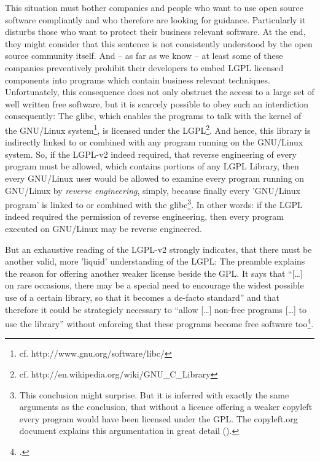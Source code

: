 This situation must bother companies and people who want to use open source
software compliantly and who therefore are looking for guidance. Particularly it
disturbs those who want to protect their business relevant software. At the end,
they might consider that this sentence is not consistently understood by the
open source community itself. And -- as far as we know -- at least some of these
companies preventively prohibit their developers to embed LGPL licensed
components into programs which contain business relevant techniques.
Unfortunately, this consequence does not only obstruct the access to a large set
of well written free software, but it is scarcely possible to obey such an
interdiction consequently: The glibc, which enables the programs to talk with
the kernel of the GNU/Linux system\footnote{cf.
http://www.gnu.org/software/libc/}, is licensed under the LGPL\footnote{cf.
http://en.wikipedia.org/wiki/GNU\_C\_Library}. And hence, this library is
indirectly linked to or combined with any program running on the GNU/Linux
system. So, if the LGPL-v2 indeed required, that reverse engineering of every
program must be allowed, which contains portions of any LGPL Library, then every
GNU/Linux user would be allowed to examine every program running on GNU/Linux by
\emph{reverse engineering}, simply, because finally every 'GNU/Linux program' is
linked to or combined with the glibc\footnote{This conclusion might surprise.
But it is inferred with exactly the same arguments as the conclusion, that
without a licence offering a weaker copyleft every program would have been
licensed under the GPL. The copyleft.org document explains this argumentation in
great detail (\cite[cf.][56f]{KuhSebGin2014a}).}. In other words: if the LGPL
indeed required the permission of reverse engineering, then
every program executed on GNU/Linux may be reverse engineered.

But an exhaustive reading of the LGPL-v2 strongly indicates, that there must be
another valid, more 'liquid' understanding of the LGPL: The preamble explains
the reason for offering another weaker license beside the GPL. It says that
\enquote{[\ldots] on rare occasions, there may be a special need to encourage
the widest possible use of a certain library, so that it becomes a de-facto
standard} and that therefore it could be strategicly necessary to \enquote{allow
[\ldots] non-free programs [\ldots] to use the library} without enforcing that
these programs become free software too\footcite[cf.][\nopage wp,
§preamble]{Lgpl21OsiLicense1999a}.


